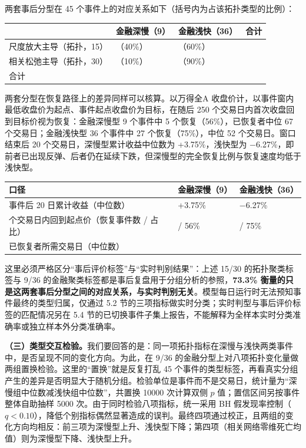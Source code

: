 \documentclass[12pt,a4paper]{ctexart}
\begin{document}
两套事后分型在 45 个事件上的对应关系如下（括号内为占该拓扑类型的比例）：\par
\begin{center}\small
\begin{tabularx}{\textwidth}{>{\raggedright\arraybackslash}X>{\centering\arraybackslash}X>{\centering\arraybackslash}X>{\centering\arraybackslash}X}
\toprule
 & \textbf{金融深慢（9）} & \textbf{金融浅快（36）} & \textbf{合计} \\
\midrule
尺度放大主导（拓扑，15） & 6（40\%） & 9（60\%） & 15 \\
相关松弛主导（拓扑，30） & 3（10\%） & 27（90\%） & 30 \\
\midrule
合计 & 9 & 36 & 45 \\
\bottomrule
\end{tabularx}
\end{center}
两套分型在恢复路径上的差异同样可以核算。以万得全A 收盘价计，以事件窗内最低收盘价为起点、事件起点收盘价为目标，在随后 250 个交易日内首次收盘回到目标价视为恢复：金融深慢型 9 个事件中 5 个恢复（56\%），已恢复者中位 67 个交易日；金融浅快型 36 个事件中 27 个恢复（75\%），中位 52 个交易日。窗口结束后 20 个交易日，深慢型累计收益中位数为 +3.75\%，浅快型为 \(-\)6.27\%，即前者已出现反弹、后者仍在延续下跌，但深慢型的完全恢复比例与恢复速度均低于浅快型。\par
\begin{center}\small
\begin{tabularx}{\textwidth}{>{\raggedright\arraybackslash}X>{\centering\arraybackslash}X>{\centering\arraybackslash}X}
\toprule
\textbf{口径} & \textbf{金融深慢（9）} & \textbf{金融浅快（36）} \\
\midrule
事件后 20 日累计收益（中位数） & +3.75\% & \(-\)6.27\% \\
250 个交易日内回到起点价（恢复事件数 / 占比） & 5 / 56\% & 27 / 75\% \\
已恢复者所需交易日（中位数） & 67 & 52 \\
\bottomrule
\end{tabularx}
\end{center}
这里必须严格区分“事后评价标签”与“实时判别结果”：上述 15/30 的拓扑聚类标签与 9/36 的金融聚类标签都是事后复盘用于分组分析的参照，\textbf{73.3\% 衡量的只是这两套事后分型之间的对应关系，与实时判别无关}。模型每日运行时无法预知事件最终的类型归属，仅通过 5.2 节的三项指标做实时分类；实时判型与事后评价标签的匹配情况另在 5.4 节的已切换事件子集上报告，不能解释为全样本实时分类准确率或独立样本外分类准确率。\par
\textbf{（三）类型交互检验。}我们要回答的是：同一项拓扑指标在深慢与浅快两类事件中，是否呈现不同的变化方向。为此，在 9/36 的金融分型上对八项拓扑变化量做两组置换检验。这里的“置换”就是反复打乱 45 个事件的类型标签，再看真实分组产生的差异是否明显大于随机分组。检验单位是事件而不是交易日，统计量为“深慢组中位数减浅快组中位数”，共置换 10000 次计算双侧 \(p\) 值；置信区间另按事件整体自助抽样 5000 次。由于同时检验八项指标，统一采用 BH 假发现率控制（\(q<0.10\)），降低个别指标偶然显著造成的误判。最终四项通过校正，且两组的变化方向均相反：前三项为深慢型上升、浅快型下降；第四项（相关网络零维死亡均值）则为深慢型下降、浅快型上升。\par
\end{document}
